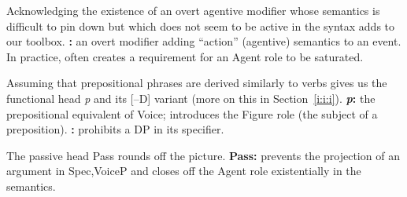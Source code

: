 Acknowledging the existence of an overt agentive modifier whose semantics is difficult to pin down but which does not seem to be active in the syntax adds {\va} to our toolbox.
\ex \textbf{{\va}:} an overt modifier adding ``action'' (agentive) semantics to an event. In practice, often creates a requirement for an Agent role to be saturated.
\xe

Assuming that prepositional phrases are derived similarly to verbs gives us the functional head \textit{p} and its [--D] variant {\pz} (more on this in Section~\ref{i:i:i}).
\pex
	\a \textbf{\textit{p}:} the prepositional equivalent of Voice; introduces the Figure role (the subject of a preposition).
	\a \textbf{{\pz}:} prohibits a DP in its specifier.
\xe

The passive head Pass rounds off the picture.
\ex \textbf{Pass:} prevents the projection of an argument in Spec,VoiceP and closes off the Agent role existentially in the semantics.
\xe

